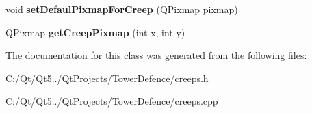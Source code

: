 \begin{DoxyCompactItemize}
\item 
\hypertarget{class_creeps_aee8fe12073d31e2d10fa3668fb749915}{}void {\bfseries set\+Defaul\+Pixmap\+For\+Creep} (Q\+Pixmap pixmap)\label{class_creeps_aee8fe12073d31e2d10fa3668fb749915}

\item 
\hypertarget{class_creeps_ac94c0c7a0bf3e08d73b6c94514692437}{}Q\+Pixmap {\bfseries get\+Creep\+Pixmap} (int x, int y)\label{class_creeps_ac94c0c7a0bf3e08d73b6c94514692437}

\end{DoxyCompactItemize}


The documentation for this class was generated from the following files\+:\begin{DoxyCompactItemize}
\item 
C\+:/\+Qt/\+Qt5../\+Qt\+Projects/\+Tower\+Defence/creeps.\+h\item 
C\+:/\+Qt/\+Qt5../\+Qt\+Projects/\+Tower\+Defence/creeps.\+cpp\end{DoxyCompactItemize}
